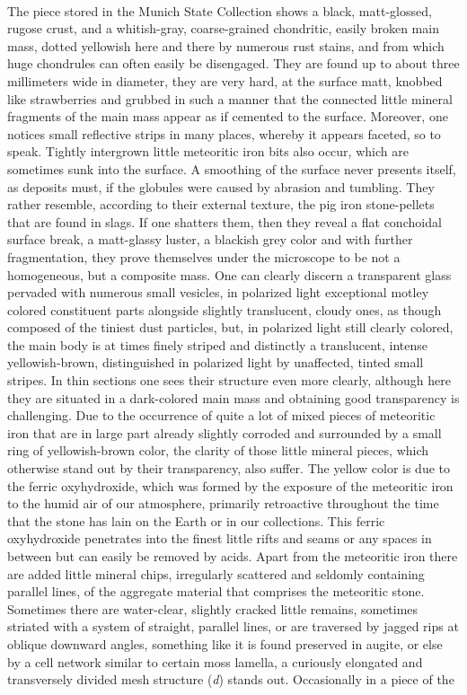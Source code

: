 \documentclass[a4paper, 12pt, oneside]{article}
\begin{document}
\paragraph{}
The piece stored in the Munich State Collection shows a black, matt-glossed, rugose crust, and a whitish-gray, coarse-grained chondritic, easily broken main mass, dotted yellowish here and there by numerous rust stains, and from which huge chondrules can often easily be disengaged. They are found up to about three millimeters wide in diameter, they are very hard, at the surface matt, knobbed like strawberries and grubbed in such a manner that the connected little mineral fragments of the main mass appear as if cemented to the surface. Moreover, one notices small reflective strips in many places, whereby it appears faceted, so to speak. Tightly intergrown little meteoritic iron bits also occur, which are sometimes sunk into the surface. A smoothing of the surface never presents itself, as deposits must, if the globules were caused by abrasion and tumbling. They rather resemble, according to their external texture, the pig iron stone-pellets that are found in slags. If one shatters them, then they reveal a flat conchoidal surface break, a matt-glassy luster, a blackish grey color and with further fragmentation, they prove themselves under the microscope to be not a homogeneous, but a composite mass. One can clearly discern a transparent glass pervaded with numerous small vesicles, in polarized light exceptional motley colored constituent parts alongside slightly translucent, cloudy ones, as though composed of the tiniest dust particles, but, in polarized light still clearly colored, the main body is at times finely striped and distinctly a translucent, intense yellowish-brown, distinguished in polarized light by unaffected, tinted small stripes. In thin sections one sees their structure even more clearly, although here they are situated in a dark-colored main mass and obtaining good transparency is challenging. Due to the occurrence of quite a lot of mixed pieces of meteoritic iron that are in large part already slightly corroded and surrounded by a small ring of yellowish-brown color, the clarity of those little mineral pieces, which otherwise stand out by their transparency, also suffer. The yellow color is due to the ferric oxyhydroxide, which was formed by the exposure of the meteoritic iron to the humid air of our atmosphere, primarily retroactive throughout the time that the stone has lain on the Earth or in our collections. This ferric oxyhydroxide penetrates into the finest little rifts and seams or any spaces in between but can easily be removed by acids. Apart from the meteoritic iron there are added little mineral chips, irregularly scattered and seldomly containing parallel lines, of the aggregate material that comprises the meteoritic stone. Sometimes there are water-clear, slightly cracked little remains, sometimes striated with a system of straight, parallel lines, or are traversed by jagged rips at oblique downward angles, something like it is found preserved in augite, or else by a cell network similar to certain moss lamella, a curiously elongated and transversely divided mesh structure (\emph{d}) stands out. Occasionally in a piece of the 
\end{document}
